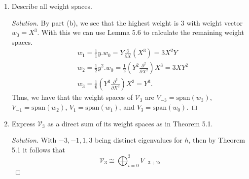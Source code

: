 \documentclass[12pt]{article}
\theoremstyle{definition}
\newenvironment{solution}
{\renewcommand\qedsymbol{$\blacksquare$}\begin{proof}[Solution]}
{\end{proof}}
\begin{document}
\begin{enumerate}
\begin{enumerate}
\begin{solution}
\begin{equation*}
                        \end{equation*}
                        Hence, the weights of $h$ are $-3, -1, 1, 3$.
                    \end{solution}
                \item Describe all weight spaces.
                    \begin{solution}
                        By part (b), we see that the highest weight is $3$ with
                        weight vector $w_0=X^3$. With this we can use Lemma 5.6 to
                        calculate the remaining weight spaces.
                        \begin{equation*}
                            \begin{split}
                                &w_1 =\frac{1}{1}y.w_0=Y\frac{\partial}{\partial
                                X}(X^3)=3X^2Y \\ 
                                &w_2=\frac{1}{2}y^2.w_0=\frac{1}{2}(Y^2\frac{\partial^2}{\partial
                                X^2})X^3=3XY^2 \\
                                &w_3=\frac{1}{6}(Y^3\frac{\partial^3}{\partial
                                X^3})X^3=Y^3.
                            \end{split}
                        \end{equation*}
                        Thus, we have that the weight spaces of $\mathcal{V}_3$
                        are $V_{-3}=\text{span}(w_3)$, $V_{-1}=\text{span}(w_2)$,
                        $V_1=\text{span}(w_1)$, and $V_3=\text{span}(w_0)$.
                    \end{solution}
                \item Express $\mathcal{V}_3$ as a direct sum of its weight
                    spaces as in Theorem 5.1.
                    \begin{solution}
                        With $-3, -1, 1, 3$ being distinct eigenvalues for $h$,
                        then by Theorem 5.1 it follows that 
                        \begin{equation*}
                            \mathcal{V}_3\cong\bigoplus_{i=0}^{3}V_{-3+2i}
                        \end{equation*}
                    \end{solution}
            \end{enumerate}
    \end{enumerate}
\end{document}
